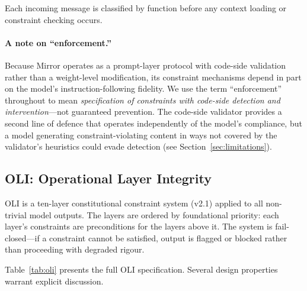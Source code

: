 \documentclass[11pt,a4paper]{article}
\begin{document}
Each incoming message is classified by function before any context loading or constraint checking occurs.

\paragraph{A note on ``enforcement.''}
Because Mirror operates as a prompt-layer protocol with code-side validation rather than a weight-level modification, its constraint mechanisms depend in part on the model's instruction-following fidelity.
We use the term ``enforcement'' throughout to mean \emph{specification of constraints with code-side detection and intervention}---not guaranteed prevention.
The code-side validator provides a second line of defence that operates independently of the model's compliance, but a model generating constraint-violating content in ways not covered by the validator's heuristics could evade detection (see Section~\ref{sec:limitations}).

\subsection{OLI: Operational Layer Integrity}
\label{sec:oli}

OLI is a ten-layer constitutional constraint system (v2.1) applied to all non-trivial model outputs.
The layers are ordered by foundational priority: each layer's constraints are preconditions for the layers above it.
The system is fail-closed---if a constraint cannot be satisfied, output is flagged or blocked rather than proceeding with degraded rigour.

Table~\ref{tab:oli} presents the full OLI specification.
Several design properties warrant explicit discussion.
\end{document}
